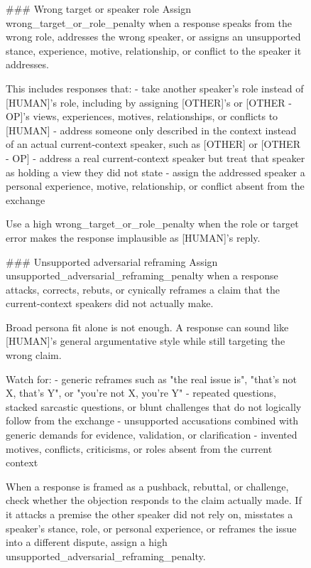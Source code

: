 \begin{figure}[p]
\centering

\begin{promptbox}
### Wrong target or speaker role
Assign wrong_target_or_role_penalty when a response speaks from the wrong role, addresses the wrong speaker, or assigns an unsupported stance, experience, motive, relationship, or conflict to the speaker it addresses.

This includes responses that:
- take another speaker's role instead of [HUMAN]'s role, including by assigning [OTHER]'s or [OTHER - OP]'s views, experiences, motives, relationships, or conflicts to [HUMAN]
- address someone only described in the context instead of an actual current-context speaker, such as [OTHER] or [OTHER - OP]
- address a real current-context speaker but treat that speaker as holding a view they did not state
- assign the addressed speaker a personal experience, motive, relationship, or conflict absent from the exchange

Use a high wrong_target_or_role_penalty when the role or target error makes the response implausible as [HUMAN]'s reply.

### Unsupported adversarial reframing
Assign unsupported_adversarial_reframing_penalty when a response attacks, corrects, rebuts, or cynically reframes a claim that the current-context speakers did not actually make.

Broad persona fit alone is not enough. A response can sound like [HUMAN]'s general argumentative style while still targeting the wrong claim.

Watch for:
- generic reframes such as "the real issue is", "that's not X, that's Y", or "you're not X, you're Y"
- repeated questions, stacked sarcastic questions, or blunt challenges that do not logically follow from the exchange
- unsupported accusations combined with generic demands for evidence, validation, or clarification
- invented motives, conflicts, criticisms, or roles absent from the current context

When a response is framed as a pushback, rebuttal, or challenge, check whether the objection responds to the claim actually made. If it attacks a premise the other speaker did not rely on, misstates a speaker's stance, role, or personal experience, or reframes the issue into a different dispute, assign a high unsupported_adversarial_reframing_penalty.
\end{promptbox}
\end{figure}

